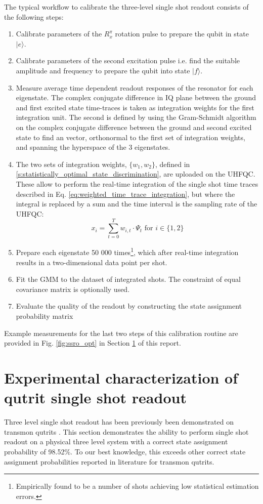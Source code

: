 The typical workflow to calibrate the three-level single shot readout consists of the following steps:
\begin{enumerate}
    \item Calibrate parameters of the $R^{\pi}_x$ rotation pulse to prepare the qubit in state $|e\rangle$. 
    \item Calibrate parameters of the second excitation pulse i.e. find the suitable amplitude and frequency to prepare the qubit into state $|f\rangle$.
    \item Measure average time dependent readout responses of the resonator for each eigenstate. The complex conjugate difference in IQ plane between the ground and first excited state time-traces is taken as integration weights for the first integration unit. The second is defined by using the Gram-Schmidt algorithm on the complex conjugate difference between the ground and second excited state to find an vector, orthonormal to the first set of integration weights, and spanning the hyperspace of the 3 eigenstates. 
    \item The two sets of integration weights,  $\{w_1, w_2\}$, defined in  \ref{s:statistically_optimal_state_discrimination}, are uploaded on the UHFQC. These allow to perform the real-time integration of the single shot time traces described in Eq. \eqref{eq:weighted_time_trace_integration}, but where the integral is replaced by a sum and the time interval is the sampling rate of the UHFQC:
    \begin{equation}
        x_i = \sum_{t=0}^{T}{w_{i,t}\cdot \Psi_t} \text{ for $i \in \{1,2\}$}
    \end{equation}
    \item Prepare each eigenstate 50 000 times\footnote{Empirically found to be a  number of shots achieving low statistical estimation errors.}, which after real-time integration results in a two-dimensional data point per shot.
    \item Fit the GMM to the dataset of integrated shots. The constraint of equal covariance matrix is optionally used. 
    \item Evaluate the quality of the readout by constructing the state assignment probability matrix
\end{enumerate}
Example measurements for the last two steps of this calibration routine are provided in Fig. \ref{fig:ssro_opt} in Section \ref{s:experimental_data} of this report. 



\section{Experimental characterization of qutrit single shot readout} \label{s:experimental_data}
Three level single shot readout has been previously been demonstrated on transmon qutrits \cite{Kurpiers2018DeterministicPhotons, Magnard2018FastQubit}. This section demonstrates the ability to perform single shot readout on a physical three level system with a correct state assignment probability of 98.52\%. To our best knowledge, this exceeds  other correct state assignment probabilities reported in literature for transmon qutrits.  

